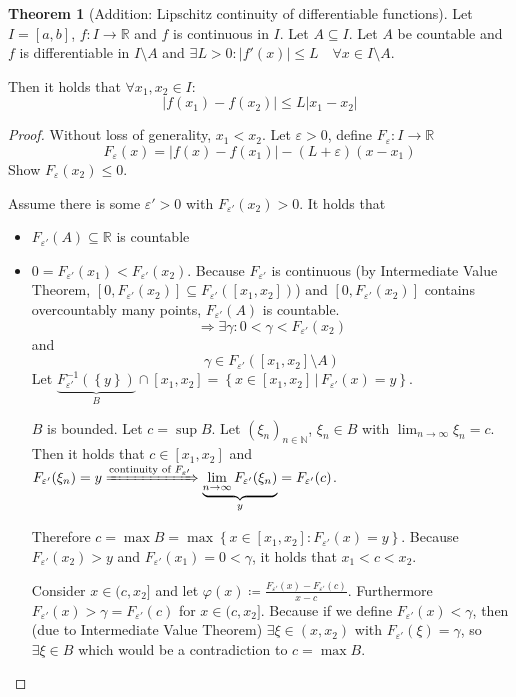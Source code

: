 \documentclass[a4paper,landscape,twocolumn]{article}
\theoremstyle{definition}
\newtheorem{theorem}{Theorem}
\newcommand\set[1]{\left\{#1\right\}}
\newcommand\setdef[2]{\left\{#1\,|\,#2\right\}}
\newcommand\abs[1]{\left|#1\right|}
\begin{document}
\begin{theorem}[Addition: Lipschitz continuity of differentiable functions]
  Let $I = [a,b]$, $f: I \to \mathbb R$ and $f$ is continuous in $I$.
  Let $A \subseteq I$. Let $A$ be countable and $f$ is differentiable in $I \setminus A$
  and $\exists L > 0: \abs{f'(x)} \leq L \quad\forall x \in I \setminus A$.

  Then it holds that $\forall x_1, x_2 \in I$:
  \[ \abs{f(x_1) - f(x_2)} \leq L\abs{x_1 - x_2} \]
\end{theorem}
\begin{proof}
  Without loss of generality, $x_1 < x_2$. Let $\varepsilon > 0$, define
  $F_\varepsilon: I \to \mathbb R$
  \[ F_{\varepsilon}(x) = \abs{f(x) - f(x_1)} - (L + \varepsilon) (x - x_1) \]
  Show $F_\varepsilon(x_2) \leq 0$.

  Assume there is some $\varepsilon' > 0$ with $F_{\varepsilon'}(x_2) > 0$.
  It holds that
  \begin{itemize}
    \item $F_{\varepsilon'}(A) \subseteq \mathbb R$ is countable
    \item $0 = F_{\varepsilon'}(x_1) < F_{\varepsilon'}(x_2)$.
      Because $F_{\varepsilon'}$ is continuous (by Intermediate Value Theorem,
      $[0,F_{\varepsilon'}(x_2)] \subseteq F_{\varepsilon'}([x_1, x_2])$)
      and $[0, F_{\varepsilon'}(x_2)]$ contains overcountably many points,
      $F_{\varepsilon'}(A)$ is countable.
      \[ \Rightarrow \exists \gamma: 0 < \gamma < F_{\varepsilon'}(x_2) \]
      and
      \[ \gamma \in F_{\varepsilon'}([x_1, x_2] \setminus A) \]
      Let $\underbrace{F_{\varepsilon'}^{-1}(\set{y})}_{B} \cap [x_1, x_2]
      = \setdef{x \in [x_1, x_2]}{F_{\varepsilon'}(x) = y}$.

      $B$ is bounded.
      Let $c = \sup{B}$. Let $(\xi_n)_{n \in \mathbb N}$, $\xi_n \in B$ with
      $\lim_{n\to\infty} \xi_n = c$. Then it holds that $c \in [x_1, x_2]$
      and $F_{\varepsilon'}(\xi_n) = y \xRightarrow{\text{continuity of } F_{\varepsilon'}}
      \underbrace{\lim_{n\to\infty} F_{\varepsilon'}(\xi_n)}_{y} = F_{\varepsilon'}(c)$.

      Therefore $c = \max{B} = \max\set{x \in [x_1, x_2]: F_{\varepsilon'}(x) = y}$.
      Because $F_{\varepsilon'}(x_2) > y$ and $F_{\varepsilon'}(x_1) = 0 < \gamma$,
      it holds that $x_1 < c < x_2$.

      Consider $x \in (c, x_2]$ and let $\varphi(x) \coloneqq
      \frac{F_{\varepsilon'}(x) - F_{\varepsilon'}(c)}{x - c}$.
      Furthermore $F_{\varepsilon'}(x) > \gamma = F_{\varepsilon'}(c)$ for $x \in (c,x_2]$.
      Because if we define $F_{\varepsilon'}(x) < \gamma$, then (due to Intermediate Value Theorem)
      $\exists \xi \in (x, x_2)$ with $F_{\varepsilon'}(\xi) = \gamma$, so $\exists \xi \in B$
      which would be a contradiction to $c = \max{B}$.


\end{itemize}
\end{proof}
\end{document}
